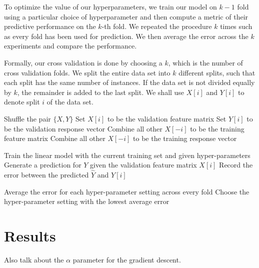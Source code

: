 \documentclass[conference]{IEEEtran}\usepackage[]{graphicx}\usepackage[]{color}
\begin{document}
To optimize the value of our hyperparameters, we train our model on $k-1$ fold
using a particular choice of hyperparameter and then compute a metric of their
predictive performance on the $k$-th fold. We repeated the procedure $k$ times
such as every fold has been used for prediction. We then average the error
across the $k$ experiments and compare the performance.

Formally, our cross validation is done by choosing a $k$, which is the number of
cross 
validation folds. We split the entire data set into $k$ different splits, such
that each split has the same number of instances. If the data set is not divided
equally by $k$, the remainder is added to the last split. We shall use $X[i]$ and
$Y[i]$ to denote split $i$ of the data set. 
\begin{algorithmic}
\State Shuffle the pair $\{X, Y\}$
    \State Set $X[i]$ to be the validation feature matrix
    \State Set $Y[i]$ to be the validation response vector
    \State Combine all other $X[-i]$ to be the training feature matrix
    \State Combine all other $X[-i]$ to be the training response vector
    
        \State Train the linear model with the current training set and given hyper-parameters
        \State Generate a prediction for $Y$ given the validation feature matrix $X[i]$
        \State Record the error between the predicted $\hat{Y}$ and $Y[i]$
    \EndFor
    
\EndFor
\State Average the error for each hyper-parameter setting across every fold
\State Choose the hyper-parameter setting with the lowest average error
\end{algorithmic}

\section{Results}

Also talk about the $\alpha$ parameter for the gradient descent.
\end{document}

